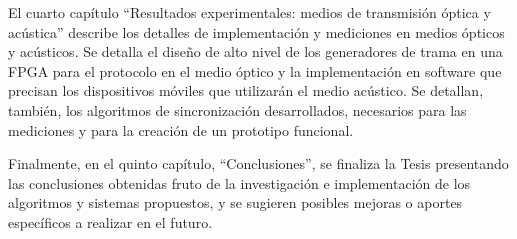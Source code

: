 El cuarto capítulo ``Resultados experimentales: medios de transmisión óptica y acústica'' describe los detalles de implementación y mediciones en medios ópticos y acústicos. Se detalla el diseño de alto nivel de los generadores de trama en una FPGA para el protocolo en el medio óptico y la implementación en software que precisan los dispositivos móviles que utilizarán el medio acústico. Se detallan, también, los algoritmos de sincronización desarrollados, necesarios para las mediciones y para la creación de un prototipo funcional.

Finalmente, en el quinto capítulo, ``Conclusiones'', se finaliza la Tesis presentando las conclusiones obtenidas fruto de la investigación e implementación de los algoritmos y sistemas propuestos, y se sugieren posibles mejoras o aportes específicos a realizar en el futuro.
